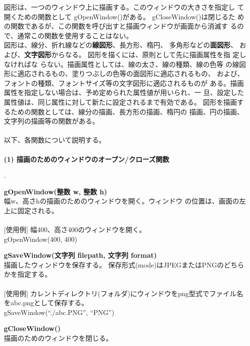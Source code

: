 \documentclass[11pt,a4j]{jarticle}
\newcounter{enum2}
\newenvironment{enumerate2}{%
   \begin{list}%
   {%
      \arabic{enum2}.\ \,%
   }%
   {%
      \usecounter{enum2}
      \setlength{\itemindent}{0zw}%
      \setlength{\leftmargin}{3zw}%
      \setlength{\rightmargin}{0zw}%
      \setlength{\labelsep}{0zw}%
      \setlength{\labelwidth}{3zw}%
      \setlength{\itemsep}{0em}%
      \setlength{\parsep}{0em}%
      \setlength{\listparindent}{0zw}%
   }
}{%
   \end{list}%
}
\begin{document}
  図形は、一つのウィンドウ上に描画する。このウィンドウの大きさを指定し
て開くための関数として gOpenWindow()がある。 gCloseWindow()は閉じるた
めの関数であるが、この関数を呼び出すと描画ウィンドウが画面から消滅す
るので、通常この関数を使用することはない。 \\
  図形は、線分、折れ線などの{\bf{線図形}}、長方形、楕円、
多角形などの{\bf{面図形}}、
および、{\bf{文字図形}}からなる。 図形を描くには、原則として先に描画属性を指 
定しなければな らない。描画属性としては、線の太さ、線の種類、線の色等 
の線図形に適応されるもの、塗りつぶしの色等の面図形に適応されるもの、 
および、フォントの種類、フォントサイズ等の文字図形に適応されるものが 
ある。描画属性を指定しない場合は、予め定められた属性値が用いられ、一 
旦、設定した属性値は、同じ属性に対して新たに設定されるまで有効である。 
  図形を描画するための関数としては、線分の描画、長方形の描画、楕円の 
描画、円の描画、文字列の描画等の関数がある。 \\
\ \\
  以下、各関数について説明する。 \\
\ \\
{\large{
{\bf{
(1) 描画のためのウィンドウのオープン/クローズ関数
}}
}}
\begin{enumerate2}
\item {\bf{gOpenWindow(整数 w, 整数 h)}} \\
       幅w、高さhの描画のためのウィンドウを開く。ウィンドウ 
       の位置は、画面の左上に固定される。 \\
\ \\
	   \hspace{10pt} $[$使用例$]$  幅400、高さ400のウィンドウを開く。 \\
           \hspace{55pt} gOpenWindow(400, 400)  \\

\item {\bf{gSaveWindow(文字列 filepath, 文字列 format)}} \\
     描画したウィンドウを保存する。
     保存形式(mode)はJPEGまたはPNGのどちらかを指定する。 \\
\ \\
	   \hspace{10pt} $[$使用例$]$  カレントディレクトリ(フォルダ)にウィンドウをpng型式でファイル名をabc.pngとして保存する。 \\
           \hspace{55pt} gSaveWindow(``./abc.PNG'', ``PNG'')\\

\item {\bf{gCloseWindow()}} \\
       描画のためのウィンドウを閉じる。
\end{enumerate2}
\end{document}
